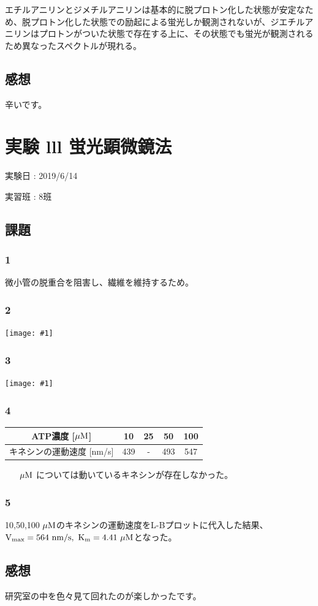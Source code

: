 \documentclass[a4paper,papersize,dvipdfmx]{jsarticle}
\newcommand{\pict}[2]{\begin{center} \texttt{[image: \#1]} \end{center}}   %
\begin{document}
エチルアニリンとジメチルアニリンは基本的に脱プロトン化した状態が安定なため、脱プロトン化した状態での励起による蛍光しか観測されないが、ジエチルアニリンはプロトンがついた状態で存在する上に、その状態でも蛍光が観測されるため異なったスペクトルが現れる。


\subsection*{感想}
辛いです。

\newpage

\section*{実験 lll 蛍光顕微鏡法}
\begin{flushright}
実験日 : 2019/6/14

実習班 : 8班
\end{flushright}

\subsection*{課題}

\subsubsection*{1}
微小管の脱重合を阻害し、繊維を維持するため。

\subsubsection*{2}
\pict{imgs/kd3.jpeg}{8}

\subsubsection*{3}
\pict{imgs/kd4.jpeg}{10}
\subsubsection*{4}
\begin{table}[H]
\begin{center}
\begin{tabular}{|c|c|c|c|c|}
\hline
ATP濃度 [$\rm \mu M$] & 10 & 25 & 50 & 100 \\ \hline
キネシンの運動速度 [nm/s] & 439 & -       & 493          & 547    \\ \hline
\end{tabular}
\end{center}
\end{table}

\begin{enumerate}
\item [$\rm \mu M$]については動いているキネシンが存在しなかった。


\end{enumerate}
\subsubsection*{5}

10,50,100 $\rm \mu M$のキネシンの運動速度をL-Bプロットに代入した結果、$\rm V_{max} = 564 \ nm/s, \ K_m = 4.41 \  \mu M$となった。


\subsection*{感想}

研究室の中を色々見て回れたのが楽しかったです。
\end{document}
